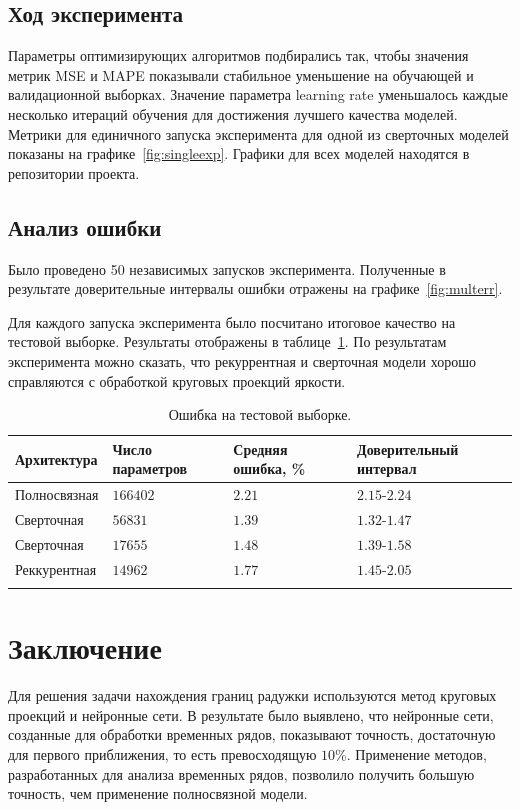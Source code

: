 \documentclass[12pt, twoside]{article}
\begin{document}
\subsection{Ход эксперимента}
Параметры оптимизирующих алгоритмов подбирались так, чтобы значения метрик MSE и MAPE показывали стабильное уменьшение на обучающей и валидационной выборках. Значение параметра learning rate уменьшалось каждые несколько итераций обучения для достижения лучшего качества моделей. Метрики для единичного запуска эксперимента для одной из сверточных моделей показаны на графике~\ref{fig:singleexp}. Графики для всех моделей находятся в репозитории проекта.


\subsection{Анализ ошибки}
Было проведено 50 независимых запусков эксперимента. Полученные в результате доверительные интервалы ошибки отражены на графике~\ref{fig:multerr}.

Для каждого запуска эксперимента было посчитано итоговое качество на тестовой выборке. Результаты отображены в таблице~\ref{table:error}. По результатам эксперимента можно сказать, что рекуррентная и сверточная модели хорошо справляются с обработкой круговых проекций яркости.

\begin{longtable}[]{@{}llll@{}}
\toprule
Архитектура & Число параметров & Средняя ошибка, \% & Доверительный интервал\tabularnewline
\midrule
\endhead
Полносвязная & $166402$ & $2.21$ & $2.15$-$2.24$\tabularnewline
Сверточная & $56831$\ & $1.39$ & $1.32$-$1.47$\tabularnewline
Сверточная & $17655$ & $1.48$ & $1.39$-$1.58$\tabularnewline
Реккурентная & $14962$ & $1.77$ & $1.45$-$2.05$\tabularnewline
\bottomrule
\caption{Ошибка на тестовой выборке.}
\label{table:error}
\end{longtable}

\section{Заключение}
Для решения задачи нахождения границ радужки используются метод круговых проекций и нейронные сети. В результате было выявлено, что нейронные сети, созданные для обработки временных рядов, показывают точность, достаточную для первого приближения, то есть превосходящую $10\%$. Применение методов, разработанных для анализа временных рядов, позволило получить большую точность, чем применение полносвязной модели.
\end{document}
